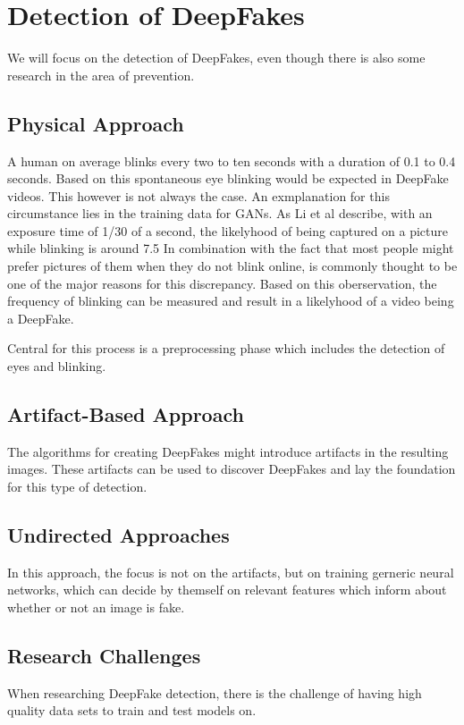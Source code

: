 \section{Detection of DeepFakes}
We will focus on the detection of DeepFakes, even though there is also some research in the area of
prevention.

\subsection{Physical Approach}
A human on average blinks every two to ten seconds with a duration of 0.1 to 0.4 seconds\cite{li_ictu_2018}.
Based on this spontaneous eye blinking would be expected in DeepFake videos.
This however is not always the case.
An exmplanation for this circumstance lies in the training data for GANs.
As Li et al describe\cite{li_ictu_2018}, with an exposure time of 1/30 of a second,
the likelyhood of being captured on a picture while blinking is around 7.5%
In combination with the fact that most people might prefer pictures of them when they do not blink online,
is commonly thought to be one of the major reasons for this discrepancy\cite{pishori_detecting_2020}.
Based on this oberservation, the frequency of blinking can be measured and result in a likelyhood of
a video being a DeepFake.

Central for this process is a preprocessing phase which includes the detection of eyes and blinking.



\subsection{Artifact-Based Approach}
The algorithms for creating DeepFakes might introduce artifacts in the resulting images.
These artifacts can be used to discover DeepFakes and lay the foundation for this type of detection.

\subsection{Undirected Approaches}
In this approach, the focus is not on the artifacts, but on training gerneric neural networks, which can decide by themself on relevant
features which inform about whether or not an image is fake.

\subsection{Research Challenges}
When researching DeepFake detection, there is the challenge of having high quality data sets to train and test models on\cite{li_celeb-df_2019}.
